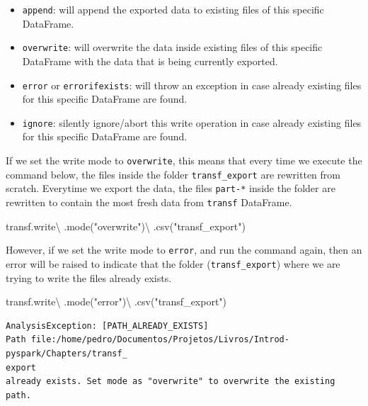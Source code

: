 \documentclass[
  11pt,
  letterpaper,
  DIV=11,
  numbers=noendperiod]{scrreprt}
\newenvironment{Shaded}{\begin{snugshade}}{\end{snugshade}}
\newcommand{\NormalTok}[1]{\textcolor[rgb]{0.00,0.23,0.31}{#1}}
\newcommand{\OperatorTok}[1]{\textcolor[rgb]{0.37,0.37,0.37}{#1}}
\newcommand{\StringTok}[1]{\textcolor[rgb]{0.13,0.47,0.30}{#1}}
\providecommand{\tightlist}{%
  \setlength{\itemsep}{0pt}\setlength{\parskip}{0pt}}\usepackage{longtable,booktabs,array}
\begin{document}
\begin{itemize}
\tightlist
\item
  \texttt{append}: will append the exported data to existing files of
  this specific DataFrame.
\item
  \texttt{overwrite}: will overwrite the data inside existing files of
  this specific DataFrame with the data that is being currently
  exported.
\item
  \texttt{error} or \texttt{errorifexists}: will throw an exception in
  case already existing files for this specific DataFrame are found.
\item
  \texttt{ignore}: silently ignore/abort this write operation in case
  already existing files for this specific DataFrame are found.
\end{itemize}

If we set the write mode to \texttt{overwrite}, this means that every
time we execute the command below, the files inside the folder
\texttt{transf\_export} are rewritten from scratch. Everytime we export
the data, the files \texttt{part-*} inside the folder are rewritten to
contain the most fresh data from \texttt{transf} DataFrame.

\begin{Shaded}
\begin{Highlighting}[]
\NormalTok{transf.write}\OperatorTok{\textbackslash{}}
\NormalTok{    .mode(}\StringTok{"overwrite"}\NormalTok{)}\OperatorTok{\textbackslash{}}
\NormalTok{    .csv(}\StringTok{"transf\_export"}\NormalTok{)}
\end{Highlighting}
\end{Shaded}

However, if we set the write mode to \texttt{error}, and run the command
again, then an error will be raised to indicate that the folder
(\texttt{transf\_export}) where we are trying to write the files already
exists.

\begin{Shaded}
\begin{Highlighting}[]
\NormalTok{transf.write}\OperatorTok{\textbackslash{}}
\NormalTok{    .mode(}\StringTok{"error"}\NormalTok{)}\OperatorTok{\textbackslash{}}
\NormalTok{    .csv(}\StringTok{"transf\_export"}\NormalTok{)}
\end{Highlighting}
\end{Shaded}

\begin{verbatim}
AnalysisException: [PATH_ALREADY_EXISTS]
Path file:/home/pedro/Documentos/Projetos/Livros/Introd-pyspark/Chapters/transf_
export
already exists. Set mode as "overwrite" to overwrite the existing path.
\end{verbatim}
\end{document}
